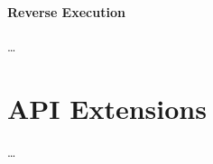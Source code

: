 \paragraph{Reverse Execution}
\label{par:futurework_simicsproductification_reverseexecution}
\ldots


\section{API Extensions}
\label{sec:futurework_apiextensions}
\ldots


